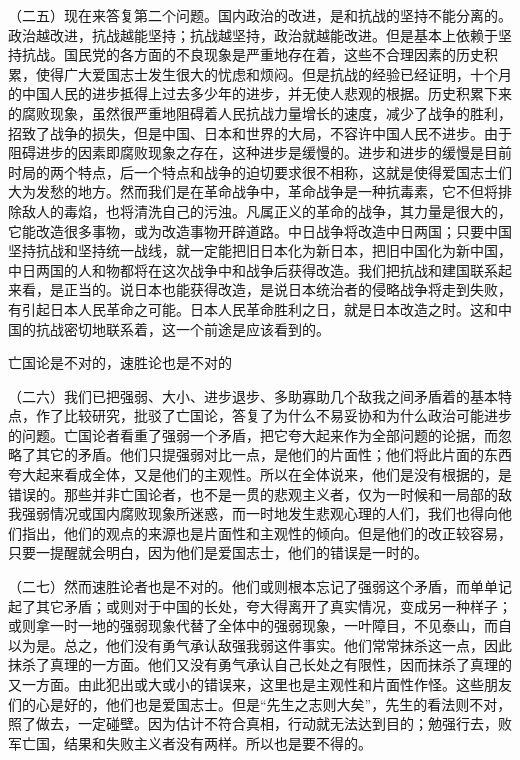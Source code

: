 \documentclass[UTF8, 12pt, a4paper]{ctexrep}
\begin{document}
（二五）现在来答复第二个问题。国内政治的改进，是和抗战的坚持不能分离的。政治越改进，抗战越能坚持；抗战越坚持，政治就越能改进。但是基本上依赖于坚持抗战。国民党的各方面的不良现象是严重地存在着，这些不合理因素的历史积累，使得广大爱国志士发生很大的忧虑和烦闷。但是抗战的经验已经证明，十个月的中国人民的进步抵得上过去多少年的进步，并无使人悲观的根据。历史积累下来的腐败现象，虽然很严重地阻碍着人民抗战力量增长的速度，减少了战争的胜利，招致了战争的损失，但是中国、日本和世界的大局，不容许中国人民不进步。由于阻碍进步的因素即腐败现象之存在，这种进步是缓慢的。进步和进步的缓慢是目前时局的两个特点，后一个特点和战争的迫切要求很不相称，这就是使得爱国志士们大为发愁的地方。然而我们是在革命战争中，革命战争是一种抗毒素，它不但将排除敌人的毒焰，也将清洗自己的污浊。凡属正义的革命的战争，其力量是很大的，它能改造很多事物，或为改造事物开辟道路。中日战争将改造中日两国；只要中国坚持抗战和坚持统一战线，就一定能把旧日本化为新日本，把旧中国化为新中国，中日两国的人和物都将在这次战争中和战争后获得改造。我们把抗战和建国联系起来看，是正当的。说日本也能获得改造，是说日本统治者的侵略战争将走到失败，有引起日本人民革命之可能。日本人民革命胜利之日，就是日本改造之时。这和中国的抗战密切地联系着，这一个前途是应该看到的。

亡国论是不对的，速胜论也是不对的

（二六）我们已把强弱、大小、进步退步、多助寡助几个敌我之间矛盾着的基本特点，作了比较研究，批驳了亡国论，答复了为什么不易妥协和为什么政治可能进步的问题。亡国论者看重了强弱一个矛盾，把它夸大起来作为全部问题的论据，而忽略了其它的矛盾。他们只提强弱对比一点，是他们的片面性；他们将此片面的东西夸大起来看成全体，又是他们的主观性。所以在全体说来，他们是没有根据的，是错误的。那些并非亡国论者，也不是一贯的悲观主义者，仅为一时候和一局部的敌我强弱情况或国内腐败现象所迷惑，而一时地发生悲观心理的人们，我们也得向他们指出，他们的观点的来源也是片面性和主观性的倾向。但是他们的改正较容易，只要一提醒就会明白，因为他们是爱国志士，他们的错误是一时的。

（二七）然而速胜论者也是不对的。他们或则根本忘记了强弱这个矛盾，而单单记起了其它矛盾；或则对于中国的长处，夸大得离开了真实情况，变成另一种样子；或则拿一时一地的强弱现象代替了全体中的强弱现象，一叶障目，不见泰山，而自以为是。总之，他们没有勇气承认敌强我弱这件事实。他们常常抹杀这一点，因此抹杀了真理的一方面。他们又没有勇气承认自己长处之有限性，因而抹杀了真理的又一方面。由此犯出或大或小的错误来，这里也是主观性和片面性作怪。这些朋友们的心是好的，他们也是爱国志士。但是“先生之志则大矣”，先生的看法则不对，照了做去，一定碰壁。因为估计不符合真相，行动就无法达到目的；勉强行去，败军亡国，结果和失败主义者没有两样。所以也是要不得的。
\end{document}
